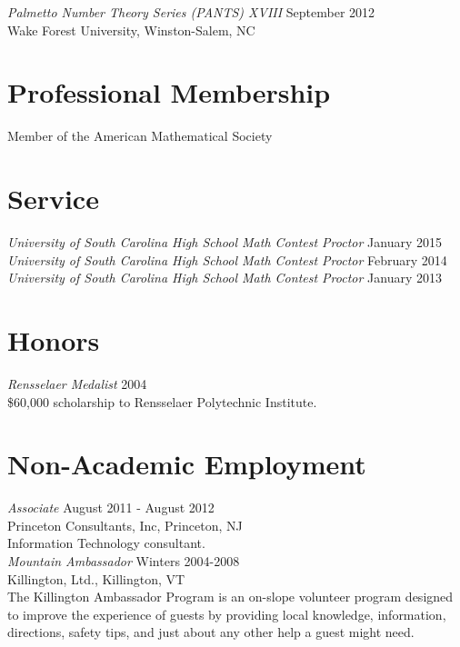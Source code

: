\documentclass{article}
\begin{document}
\noindent\textsl{Palmetto Number Theory Series (PANTS) XVIII} \hfill September 2012\\
Wake Forest University, Winston-Salem, NC



\section*{Professional Membership}
Member of the American Mathematical Society

\section*{Service}
\textsl{University of South Carolina High School Math Contest Proctor} \hfill January 2015\\
\textsl{University of South Carolina High School Math Contest Proctor} \hfill February 2014\\
\textsl{University of South Carolina High School Math Contest Proctor} \hfill January 2013

\section*{Honors}
\textsl{Rensselaer Medalist} \hfill 2004\\
\$60,000 scholarship to Rensselaer Polytechnic Institute.

\section*{Non-Academic Employment}             
\textsl{Associate} \hfill August 2011 - August 2012\\
Princeton Consultants, Inc, Princeton, NJ\\
Information Technology consultant.\\

\noindent\textsl{Mountain Ambassador} \hfill Winters 2004-2008\\
Killington, Ltd., Killington, VT \\
The Killington Ambassador Program is an on-slope volunteer program
designed to improve the experience of guests by providing local knowledge, 
information, directions, safety tips, and just about any other help a guest might need.
\end{document}
